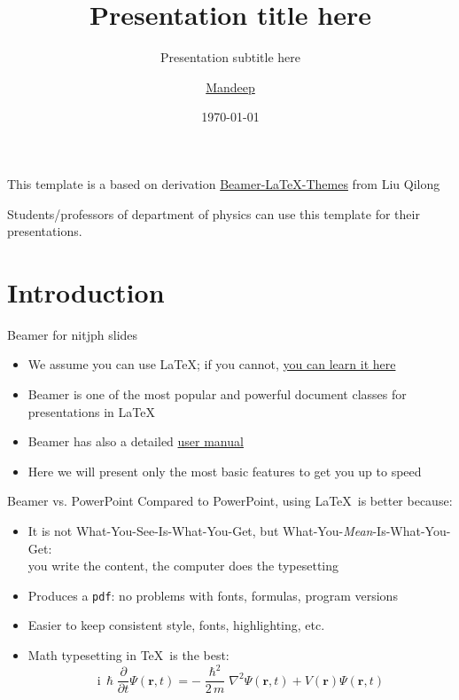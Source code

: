 \documentclass{beamer}
\title{Presentation title here}
\subtitle{Presentation subtitle here}
\author{\href{mailto:majorandro@gmail.com}{Mandeep}}
\date{\today}
\newcommand{\hrefcol}[2]{\textcolor{cyan}{\href{#1}{#2}}}
\begin{document}
\maketitle
{}
\begin{frame}

This template is a based on derivation \hrefcol{https://github.com/TOB-KNPOB/Beamer-LaTeX-Themes}{Beamer-LaTeX-Themes} from Liu Qilong

\vspace{\baselineskip}
Students/professors of department of physics can use this template for their presentations.

\end{frame}

\section{Introduction}

\begin{frame}{Beamer for nitjph slides}
\begin{itemize}
\item We assume you can use \LaTeX; if you cannot,
\hrefcol{http://en.wikibooks.org/wiki/LaTeX/}{you can learn it here}
\item Beamer is one of the most popular and powerful document
classes for presentations in \LaTeX
\item Beamer has also a detailed
\hrefcol{http://www.ctan.org/tex-archive/macros/latex/contrib/beamer/doc/beameruserguide.pdf}{user
 manual}
\item Here we will present only the most basic features to get you up to speed
\end{itemize}
\end{frame}

\begin{frame}{Beamer vs. PowerPoint}
Compared to PowerPoint, using \LaTeX\ is better because:
\begin{itemize}
\item It is not What-You-See-Is-What-You-Get, but
What-You-\emph{Mean}-Is-What-You-Get:\\
you write the content, the computer does the typesetting
\item Produces a \texttt{pdf}: no problems with fonts, formulas,
      program versions
\item Easier to keep consistent style, fonts, highlighting, etc.
\item Math typesetting in \TeX\ is the best:
\begin{equation*}
\mathrm{i}\,\hslash\frac{\partial}{\partial t} \Psi(\mathbf{r},t) =
-\frac{\hslash^2}{2\,m}\nabla^2\Psi(\mathbf{r},t)
+ V(\mathbf{r})\Psi(\mathbf{r},t)
\end{equation*}

\end{itemize}
\end{frame}
\end{document}
